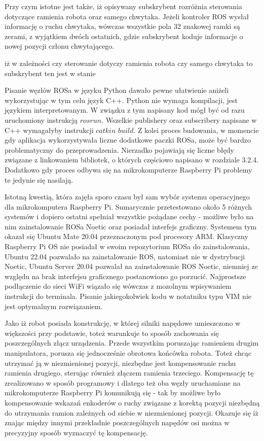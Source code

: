 Przy czym istotne jest także, iż opisywany subskrybent rozróżnia sterowania dotyczące ramienia robota oraz samego chwytaka. Jeżeli kontroler ROS wysłał informację o ruchu chwytaka, wówczas wszystkie pola 32 znakowej ramki są zerami, z wyjątkiem dwóch ostatnich, gdzie subskrybent koduje informacje o nowej pozycji członu chwytającego.

iż w zależności czy sterowanie dotyczy ramienia robota czy samego chwytaka to subskrybent ten jest w stanie

Pisanie węzłów ROSa w języku Python dawało pewne ułatwienie aniżeli wykorzystując w tym celu język C++. Python nie wymaga kompilacji, jest językiem interpretowanym. W związku z tym napisany kod mógł być od razu uruchomiony instrukcją $rosrun$. Wszelkie publishery oraz subscribery napisane w C++ wymagałyby instrukcji $catkin$ $build$. Z kolei proces budowania, w momencie gdy aplikacja wykorzystywała liczne dodatkowe paczki ROSa, może być bardzo problematyczny do przeprowadzenia. Nierzadko pojawiają się liczne błędy związane z linkowaniem bibliotek, o których częściowo napisano w rozdziale 3.2.4. Dodatkowo gdy proces odbywa się na mikrokomputerze Raspberry Pi problemy te jedynie się nasilają.

Istotną kwestią, która zajęła sporo czasu był sam wybór systemu operacyjnego dla mikrokomputera Raspberry Pi. Sumarycznie przetestowano około 5 różnych systemów i dopiero ostatni spełniał wszystkie pożądane cechy - możliwe było na nim zainstalowanie ROSa Noetic oraz posiadał interfejs graficzny. Systemem tym okazał się Ubuntu Mate 20.04 przeznaczonym pod procesory ARM. Klasyczny Raspberry Pi OS nie posiadał w swoim repozytorium ROSa do zainstalowania, Ubuntu 22.04 pozwalało na zainstalowanie ROS, natomiast nie w dystrybucji Noetic, Ubuntu Server 20.04 pozwalał na zainstalowanie ROS Noetic, niemniej ze względu na brak interfejsu graficznego postanowiono go porzucić. Najprostsze podłączenie do sieci WiFi wiązało się wówczas z mozolnym wpisywaniem instrukcji do terminala. Pisanie jakiegokolwiek kodu w notatniku typu VIM nie jest optymalnym rozwiązaniem.


Jako iż robot posiada konstrukcję, w której silniki napędowe umieszczono w większości przy podstawie, toteż warunkuje to sposób zachowania się poszczególnych złącz urządzenia. Przede wszystkim poruszając ramieniem drugim manipulatora, porusza się jednocześnie obrotowa końcówka robota. Toteż chcąc utrzymać ją w niezmienionej pozycji, niezbędne jest kompensowanie ruchu ramienia drugiego, sterując również złączem ramienia trzeciego. Kompensację tę zrealizowano w sposób programowy i dlatego też oba węzły uruchamiane na mikrokomputerze Raspberry Pi komunikują się - tak by możliwe było kompensowanie wskazań enkoderów o ruchy związane z korektą pozycji niezbędną do utrzymania ramion zależnych od siebie w niezmienionej pozycji. Okazuje się iż znając między innymi przekładnie poszczególnych napędów osi można w precyzyjny sposób wyznaczyć tę kompensację.

